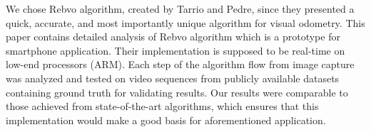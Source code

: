 We chose Rebvo algorithm, created by Tarrio and Pedre, since they presented a quick, accurate, and most importantly unique algorithm for visual odometry. This paper contains detailed analysis of Rebvo algorithm which is a prototype for smartphone application. Their implementation is supposed to be real-time on low-end processors (ARM).
Each step of the algorithm flow from image capture was analyzed and tested on video sequences from publicly available datasets containing ground truth for validating results. Our results were comparable to those achieved from state-of-the-art algorithms, which ensures that this implementation would make a good basis for aforementioned application.

\clearpage 